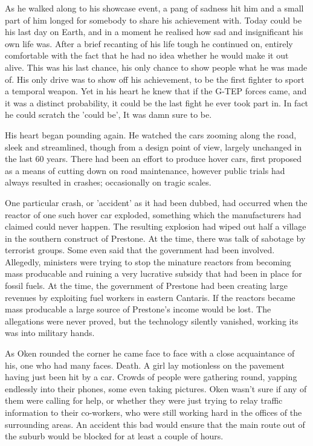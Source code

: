 As he walked along to his showcase event, a pang of sadness hit him and a small part of him longed for somebody to share his achievement with. Today could be his last day on Earth, and in a moment he realised how sad and insignificant his own life was. After a brief recanting of his life tough he continued on, entirely comfortable with the fact that he had no idea whether he would make it out alive. This was his last chance, his only chance to show people what he was made of. His only drive was to show off his achievement, to be the first fighter to sport a temporal weapon. Yet in his heart he knew that if the G-TEP forces came, and it was a distinct probability, it could be the last fight he ever took part in. In fact he could scratch the 'could be', It was damn sure to be.

His heart began pounding again. He watched the cars zooming along the road, sleek and streamlined, though from a design point of view, largely unchanged in the last 60 years. There had been an effort to produce hover cars, first proposed as a means of cutting down on road maintenance, however public trials had always resulted in crashes; occasionally on tragic scales.

One particular crash, or 'accident' as it had been dubbed, had occurred when the reactor of one such hover car exploded, something which the manufacturers had claimed could never happen. The resulting explosion had wiped out half a village in the southern construct of Prestone. At the time, there was talk of sabotage by terrorist groups. Some even said that the government had been involved. Allegedly, ministers were trying to stop the minature reactors from becoming mass producable and ruining a very lucrative subsidy that had been in place for fossil fuels. At the time, the government of Prestone had been creating large revenues by exploiting fuel workers in eastern Cantaris. If the reactors became mass producable a large source of Prestone's income would be lost. The allegations were never proved, but the technology silently vanished, working its was into military hands.

As Oken rounded the corner he came face to face with a close acquaintance of his, one who had many faces. Death. A girl lay motionless on the pavement having just been hit by a car. Crowds of people were gathering round, yapping endlessly into their phones, some even taking pictures. Oken wasn't sure if any of them were calling for help, or whether they were just trying to relay traffic information to their co-workers, who were still working hard in the offices of the surrounding areas. An accident this bad would ensure that the main route out of the suburb would be blocked for at least a couple of hours.

